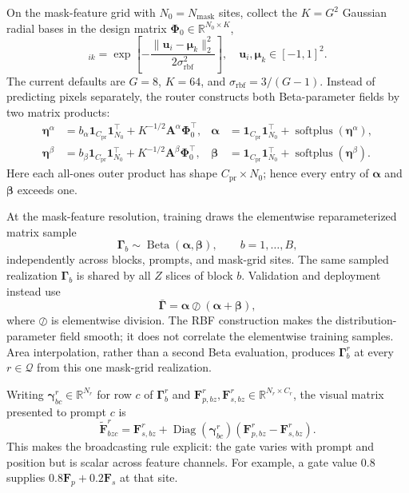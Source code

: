 \documentclass[10pt]{article}
\newcommand{\R}{\mathbb{R}}
\newcommand{\cQ}{\mathcal{Q}}
\newcommand{\ones}{\bm{1}}
\newcommand{\diag}{\operatorname{Diag}}
\newcommand{\softplus}{\operatorname{softplus}}
\newcommand{\balpha}{\bm{\alpha}}
\newcommand{\bbeta}{\bm{\beta}}
\begin{document}
On the mask-feature grid with $N_0=N_{\mathrm{mask}}$ sites, collect the
$K=G^2$ Gaussian radial bases in the design matrix
$\bm\Phi_0\in\R^{N_0\times K}$,
\begin{equation}
    [\bm\Phi_0]_{ik}
    =\exp\!\left[-\frac{\|\bm u_i-\bm\mu_k\|_2^2}
                         {2\sigma_{\mathrm{rbf}}^2}\right],
    \quad \bm u_i,\bm\mu_k\in[-1,1]^2.
\end{equation}
The current defaults are $G=8$, $K=64$, and
$\sigma_{\mathrm{rbf}}=3/(G-1)$.  Instead of predicting pixels separately,
the router constructs both Beta-parameter fields by two matrix products:
\begin{equation}
\boxed{
\begin{aligned}
 \bm\eta^\alpha
   &=b_\alpha\ones_{C_{\mathrm{pr}}}\ones_{N_0}^\top
     +K^{-1/2}\bm A^\alpha\bm\Phi_0^\top,
 &\balpha&=\ones_{C_{\mathrm{pr}}}\ones_{N_0}^\top
             +\softplus(\bm\eta^\alpha),\\
 \bm\eta^\beta
   &=b_\beta\ones_{C_{\mathrm{pr}}}\ones_{N_0}^\top
     +K^{-1/2}\bm A^\beta\bm\Phi_0^\top,
 &\bbeta&=\ones_{C_{\mathrm{pr}}}\ones_{N_0}^\top
            +\softplus(\bm\eta^\beta).
\end{aligned}}
\label{eq:matrix-beta-field}
\end{equation}
Here each all-ones outer product has shape
$C_{\mathrm{pr}}\times N_0$; hence every entry of $\balpha$ and
$\bbeta$ exceeds one.

At the mask-feature resolution, training draws the elementwise
reparameterized matrix sample
\begin{equation}
    \bm\Gamma_b\sim\operatorname{Beta}(\balpha,\bbeta),
    \qquad b=1,\ldots,B,
\end{equation}
independently across blocks, prompts, and mask-grid sites.  The same sampled
realization $\bm\Gamma_b$ is shared by all $Z$ slices of block $b$.  Validation
and deployment instead use
\begin{equation}
    \bar{\bm\Gamma}=\balpha\oslash(\balpha+\bbeta),
    \label{eq:matrix-beta-mean}
\end{equation}
where $\oslash$ is elementwise division.  The RBF construction makes the
distribution-parameter field smooth; it does not correlate the elementwise
training samples.  Area interpolation, rather than a second Beta evaluation,
produces $\bm\Gamma_b^r$ at every $r\in\cQ$ from this one mask-grid
realization.

Writing $\bm\gamma_{bc}^r\in\R^{N_r}$ for row $c$ of $\bm\Gamma_b^r$ and
$\bm F_{p,bz}^r,\bm F_{s,bz}^r\in\R^{N_r\times C_r}$, the visual matrix
presented to prompt $c$ is
\begin{equation}
\boxed{
    \widetilde{\bm F}_{bzc}^r
    =\bm F_{s,bz}^r
     +\diag(\bm\gamma_{bc}^r)
       (\bm F_{p,bz}^r-\bm F_{s,bz}^r).}
    \label{eq:matrix-spatial-fusion}
\end{equation}
This makes the broadcasting rule explicit: the gate varies with prompt and
position but is scalar across feature channels.  For example, a gate value
$0.8$ supplies $0.8\bm F_p+0.2\bm F_s$ at that site.
\end{document}
